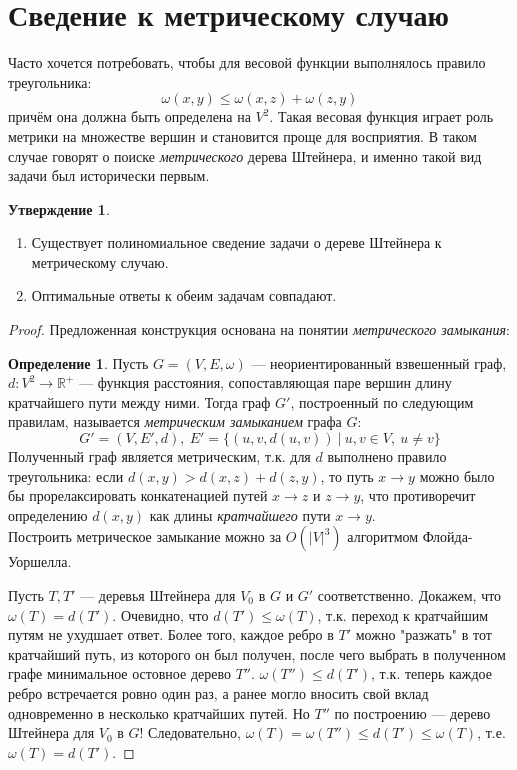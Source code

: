 \documentclass[11pt,a4paper]{report}
\def\Real{\mathbb{R}}
\def\le{\leqslant}
\theoremstyle{definition}
\theoremstyle{definition}
\newtheorem{preposition}{Утверждение}[section]
\theoremstyle{definition}
\newtheorem*{definition}{Определение}
\begin{document}
	\section{Сведение к метрическому случаю}
		Часто хочется потребовать, чтобы для весовой функции выполнялось правило треугольника:
		$$
			\omega(x, y) \le \omega(x, z) + \omega(z, y) 		
		$$
		причём она должна быть определена на $V^2$. Такая весовая функция играет роль метрики на множестве вершин и становится проще для восприятия. В таком случае говорят о поиске \textit{метрического} дерева Штейнера, и именно такой вид задачи был исторически первым.
		\begin{preposition}$  $
			\begin{enumerate}
				\item Существует полиномиальное сведение задачи о дереве Штейнера к метрическому случаю.
				\item Оптимальные ответы к обеим задачам совпадают.
			\end{enumerate}
		\end{preposition}
		\begin{proof}
			Предложенная конструкция основана на понятии \textit{метрического замыкания}:
			\begin{definition}
				Пусть $ G = (V, E, \omega) $ — неориентированный взвешенный граф, $d: V^2 \to \Real^{+} $ — функция расстояния, сопоставляющая паре вершин длину кратчайшего пути между ними. Тогда граф $G'$, построенный по следующим правилам, называется \textit{метрическим замыканием} графа $G$:
				$$
					G' = (V, E', d),\ E' = \{ (u, v, d(u, v))\ |\ u, v \in V,\ u \neq v \}
				$$
				Полученный граф является метрическим, т.к. для $d$ выполнено правило треугольника: если $ d(x, y) > d(x, z) + d(z, y) $, то путь $x \to y$ можно было бы прорелаксировать конкатенацией путей $x \to z$ и $z \to y$, что противоречит определению $d(x, y)$ как длины \textit{кратчайшего} пути $x \to y$.\\
				Построить метрическое замыкание можно за $O(|V|^3)$ алгоритмом Флойда-Уоршелла. 
			\end{definition}
			\noindent Пусть $T, T'$ — деревья Штейнера для $V_0$ в $ G $ и $ G' $ соответственно. Докажем, что $\omega(T) = d(T')$. Очевидно, что $ d(T') \le \omega(T) $, т.к. переход к кратчайшим путям не ухудшает ответ. Более того, каждое ребро в $T'$ можно "разжать" в тот кратчайший путь, из которого он был получен, после чего выбрать в полученном графе минимальное остовное дерево $T''$. $\omega(T'') \le d(T')$, т.к. теперь каждое ребро встречается ровно один раз, а ранее могло вносить свой вклад одновременно в несколько кратчайших путей. Но $T''$ по построению — дерево Штейнера для $V_0$ в $G$! Следовательно, $ \omega(T) = \omega(T'') \le d(T') \le \omega(T)$, т.е. $\omega(T) = d(T')$.
 		\end{proof}
\end{document}
